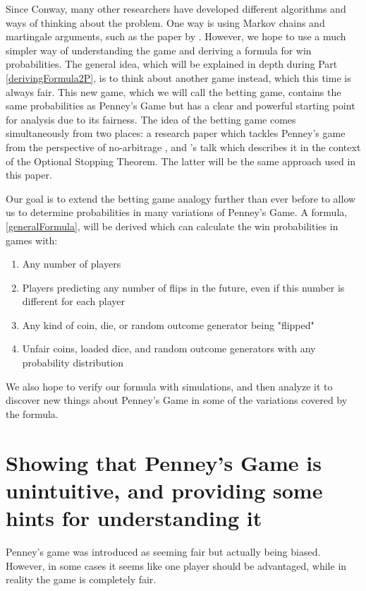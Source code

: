 \documentclass[english,12pt,a4paper,final]{article}
\begin{document}
Since Conway, many other researchers have developed different algorithms and ways of thinking about the problem. One way is using Markov chains and martingale arguments, such as the paper by \textcite{markov}. However, we hope to use a much simpler way of understanding the game and deriving a formula for win probabilities. The general idea, which will be explained in depth during Part \ref{derivingFormula2P}, is to think about another game instead, which this time is always fair. This new game, which we will call the betting game, contains the same probabilities as Penney's Game but has a clear and powerful starting point for analysis due to its fairness. The idea of the betting game comes simultaneously from two places: a research paper which tackles Penney's game from the perspective of no-arbitrage \parencite{miller}, and \textcite{chung}'s talk which describes it in the context of the Optional Stopping Theorem. The latter will be the same approach used in this paper.

Our goal is to extend the betting game analogy further than ever before to allow us to determine probabilities in many variations of Penney's Game. A formula, \eqref{generalFormula}, will be derived which can calculate the win probabilities in games with:

\begin{enumerate}
	\item Any number of players
	\item Players predicting any number of flips in the future, even if this number is different for each player
	\item Any kind of coin, die, or random outcome generator being "flipped"
	\item Unfair coins, loaded dice, and random outcome generators with any probability distribution
\end{enumerate}

We also hope to verify our formula with simulations, and then analyze it to discover new things about Penney's Game in some of the variations covered by the formula.

\part{Showing that Penney's Game is unintuitive, and providing some hints for understanding it}

Penney's game was introduced as seeming fair but actually being biased. However, in some cases it seems like one player should be advantaged, while in reality the game is completely fair.
\end{document}
